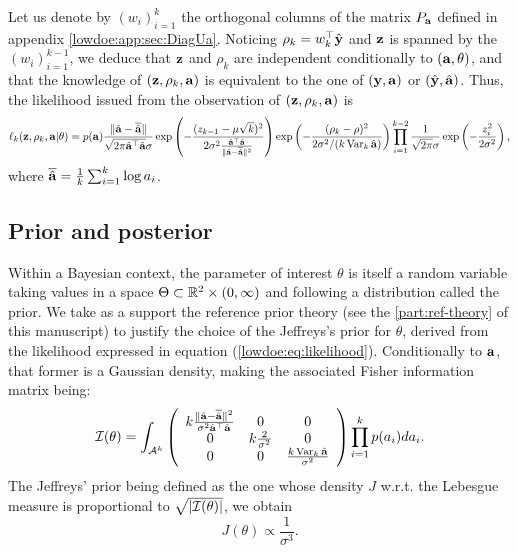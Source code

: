 Let us denote by $(w_i)_{i=1}^k$ the orthogonal columns of the matrix $P_{\mathbf{a}}$ defined in appendix \ref{lowdoe:app:sec:DiagUa}. Noticing $\rho_k = w_k^{\top}\hat{\mathbf{y}}$ and $\mathbf{z}$ is spanned by the $(w_{i})_{i=1}^{k-1}$, we deduce that $\mathbf{z}$ and $\rho_k$ are independent conditionally to $(\mathbf{a}, \theta)$, and that the knowledge of $(\mathbf{z},\rho_k,\mathbf{a})$ is equivalent to the one of $(\mathbf{y},\mathbf{a})$ or $(\hat{\mathbf{y}},\hat{\mathbf{a}})$.
Thus, the likelihood issued from the observation of $(\mathbf{z}, \rho_k, \mathbf{a})$ is 
\begin{equation}\label{lowdoe:eq:likelihood}
     \ell_k(\mathbf{z},\rho_k,\mathbf{a}|\theta) = p(\mathbf{a})\frac{\|\hat{\mathbf{a}}-\overline{\hat{\mathbf{a}}}\|}{\sqrt{2\pi\hat{\mathbf{a}}^{\top}\hat{\mathbf{a}}}\sigma}\exp\left(-\frac{(z_{k-1}-\mu \sqrt{k})^2}{2\sigma^2\frac{\hat{\mathbf{a}}^{\top}\hat{\mathbf{a}}}{\|\hat{\mathbf{a}}-\overline{\hat{\mathbf{a}}}\|^2}}\right)\exp\left({-\frac{(\rho_k-\rho)^2}{2\sigma^2/(k\operatorname{Var}_k\hat{\mathbf{a}})}}\right)\prod_{i=1}^{k-2}\frac{1}{\sqrt{2\pi}\sigma}\exp\left(-\frac{z_i^2}{2\sigma^2}\right),
\end{equation}
where $\overline{\hat{\mathbf{a}}} = \frac{1}{k}\sum_{i=1}^k \log a_i$.


    \subsection{Prior and posterior}\label{lowdoe:sec:priorposterior}
%


Within a Bayesian context, the parameter of interest $\theta$ is itself a random variable taking values in a space $\Theta\subset\mathbb{R}^2\times(0,\infty)$ and following a distribution called the prior.
We take as a support the reference prior theory (see the \cref{part:ref-theory} of this manuscript) to justify the choice of the Jeffreys's prior for $\theta$, derived from the likelihood expressed in equation (\ref{lowdoe:eq:likelihood}).
Conditionally to $\mathbf{a}$, that former is a Gaussian density, making the associated Fisher information matrix being:
       \begin{equation}    
        \mathcal{I}(\theta) = \int_{\mathcal{A}^k}\left(\begin{array}{ccc}
             k\frac{\|\hat{\mathbf{a}} - \overline{\hat{\mathbf{a}}}\|^2}{\sigma^2\hat{\mathbf{a}}^{\top}\hat{\mathbf{a}}}&  0&0\\
             0&k\frac{2}{\sigma^2}&0 \\
             0&0& \frac{k\operatorname{Var}_k\hat{\mathbf{a}}}{\sigma^2}
        \end{array}\right) \prod_{i=1}^kp(a_i)d a_i.
    \end{equation}
The Jeffreys' prior being defined as the one whose density $J$ w.r.t.{ }the Lebesgue measure is proportional to $\sqrt{|\mathcal{I}(\theta)|}$, we obtain
\begin{equation}
    J(\theta)\propto \frac{1}{\sigma^3}.
\end{equation}

